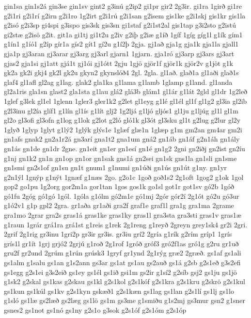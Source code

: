 {gin1sa
gin1s2á
gin3se
gin1sv
gint2
g3inú
g2ip2
gi1pr
gir2
2g3ir.
gi1ra
1girð
gi1re
g2i1ri
g2i1rí
g2irn
g2i1ro
1g2irt
g2i1rú
g2i1san
g2isem
gis1ke
g2i1skj
gis1kr
gis1la
g2isó
g2i3sp
gi4spi
g3ispo
gis3sk
gis3sn
gi1staf
g2i1st2al
gis1tap
g3i2sto
g2istú
gi2stæ
g2isö
g2it.
git1a
gi1tj
gi1t2u
g2iv
g2iþ
g2iæ
g1íð
1gíf
1gíg
gíg1l
g1ík
gím1
g1ín1
g1íó1
g2íp
gír1a
gís2
gít1
gí2u
g1í2þ
2gja.
gj1að
gja1g
gja1k
gja1la
gjall1
gja1p
gj3aran
gj3arar
gj3arg
gj3arl
gjarn1
1gjarn.
gja1ró
gj3arp
gj3ars
gj3art
gjas2
gja1si
gj1att
gjá1t
gj1ói
gj1ótt
2gju
1gjö
gjör1f
gjör1k
gjör2v
g1jöt
g1k
gk2a
gk2i
gkj4
gk2l
gk2u
gkyn2
gkynslóð4
2gl.
2gla.
gl1að.
glað1a
gl1aði
glað1s
glaf4
gl1afl
gl2ag
g1lag.
glak2
gla1ka
g1lama
g1lamb
1glamp
g1land.
gl1anda
gl2a1ris
gla1sn
glast2
gla1sta
g1lau
glá2
glá3b
glám1
gl1ár
g1lát
2gld
gl1dr
1g2leð
1glef
g3lek
gl1el
1glenn
1gler3
gler1k2
g2let
gl1eyg
g1lé
gl1él
gl1f
gl1g2
gl3ia
gl2ib
g2l3inu
gl2ía
glíf1
g1lín
gl1ís
g1lít
glj2
1g2ljá
g1ljó
gljós1
gl1ju
g1ljúg
gl1l
gl1m
gl2o
gl3ofi
gl3ofn
g1log
g1lok
g2lot
g2ló
gló1k
gl3ót
gl3sku
gl1t
g2lug
g2lur
gl2y
1glyð
1glyp
1glyt
g1lý2
1glýk
glýs1e
1glæf
glæ1n
1glæp
g1m
gm2an
gm4ar
gm2i
gn1afs
gnak2
gn2a1r2á
gn3arí
gna1t2
gna1um
gná2
gn1áb
gn1áf
g2n1áh
gn1ály
gn1ás
gn1de
gn1dr
2gne.
gn1eit
gn1er
gn1esí
gn1é
gn1g2
2gni
gn2iðj
gn2ist
gn2íu
g1nj
gn1k2
gn1n
gn1op
gn1or
gn1sak
gns1á
gn2sei
gn1sk
gns1la
gn1sli
gn1sme
gn1smi
gn2s1of
gn1su
gn1t
gnum1
g1numi
gn1úði
gn1ús
gn1út
g1ny.
gn1yr
g2n1ýl
1gnýp
g1nýt
1gnæf
g1næs
2go.
g2o1c
1goð
goð1s2
2g1oft
1gog2
g1ok
1gol
gop2
go1pu
1g2org
gor2m1a
gor1tan
1gos
gos1k
go1sl
got1r
got1sv
gó2b
1góð
gó1fu
2góg
gó1gó
1gól.
1góla
g1ólm
gó2m1e
gó1mj
2gór
gór2í
2g1ót
gó2u
gó3ur
g1ó2v1
g1p
gpl2
2gra.
gr1aða
gr1aði
gra2f
graf1e
graf1l
gra1g
gra1ma
2grame
gra1mo
2grar
gra2s
gras1á
gras1ke
gras1ky
gras1l
gra3sta
gra3sti
gras1v
gras1æ
g1raun
1grár
grá1ra
grá1st
g1reis
g1rek
2g1reng
g1reyð
2greyn
grey1sk4
gr2i
2gri.
2grif
2g1rig
gr3inu
1gri2p
gr3ir
gr3is.
gr3iu
grí2
2gría
g1rík
g2rím
gríp1
1grís
grís1l
gr1ít
1grj
grjó2
2grjú
g1roð
2g1rof
1gróð
gróf3
gró2f1as
gró1g
g2ru
gr1uð
gru2f
gr2und
2grúm
g1rún
grúsk3
1gryf
gr1ynd
2g1rýg
græ2
2græð.
gs1af
gs1ali
gs1alm
g1salu
gs1an
g1s2ann
gs3ar
gs1at
gs1au
gs2auð
gs1á
g2sb
g2s1eð
g3s2efi
gs1egg
g2s1ei
g3s2eið
gs1ey
gs1él
gs1ið
gsi1m
gs2ir
g1sí2
g2síb
gsj2
gs1ju
gs1jö
g1sk2
g2skal
gs1kas
g2skau
gs1kl
g2s1kol
g2s1kóf
g2s1kra
g2s1kru
g2skrö
g2s1kul
gs1kun
gs1kúl
gs1kv
g2s1kyn
gskæð1
g2s1kæn
gs1lag
gs1lan
g2s1lí
gs1lj
gs1lo
g1sló
gs1læ
gs2læð
gs2læg
gs1lö
gs1m
gs3me
g1smiðu
g1s2mj
gs3mur
gsn2
g1sner
gsnes2
gs1not
gs1nó
gs1ny
g2s1o
g3sok
g2s1óf
g2s1óm
g2s1óp
}
